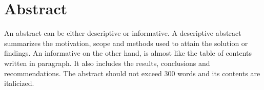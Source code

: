 \chapter*{Abstract}

An abstract can be either descriptive or informative. A descriptive abstract summarizes the motivation, scope and methods used to attain the solution or findings. An informative on the other hand, is almost like the table of contents written in paragraph. It also includes the results, conclusions and recommendations. The abstract should not exceed 300 words and its contents are italicized\cite{knuth:1984}.